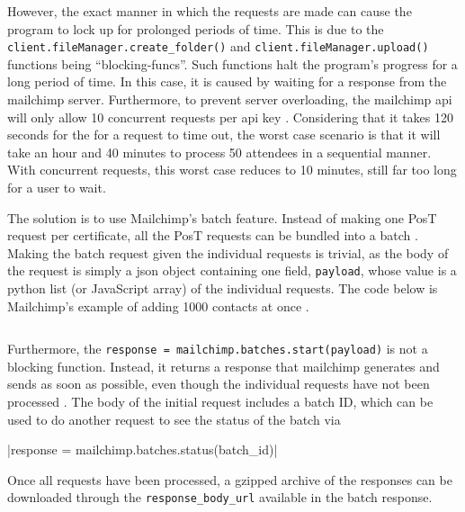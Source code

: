 \documentclass[11pt]{article}
\begin{document}
However, the exact manner in which the \gls{request}s are made can cause the program to lock up for prolonged periods of time. This is due to the \texttt{client.fileManager.create_folder()} and \texttt{client.fileManager.upload()} functions being ``\glspl{blocking-func}''. Such functions halt the program's progress for a long period of time. In this case, it is caused by waiting for a \gls{response} from the \Gls{mailchimp} \gls{server}. Furthermore, to prevent \gls{server} overloading, the \Gls{mailchimp} \acrshort{api} will only allow 10 concurrent \gls{request}s per \acrshort{api} key \cite{mailchimp-batch}. Considering that it takes 120 seconds for the for a \gls{request} to time out, the worst case scenario is that it will take an hour and 40 minutes to process 50 attendees in a sequential manner. With concurrent \gls{request}s, this worst case reduces to 10 minutes, still far too long for a \gls{user} to wait.

The solution is to use Mailchimp's \gls{batch} feature. Instead of making one P\acrshort{os}T \gls{request} per certificate, all the P\acrshort{os}T \gls{request}s can be bundled into a \gls{batch} \cite{mailchimp-batch}. Making the \gls{batch} \gls{request} given the individual \gls{request}s is trivial, as the body of the \gls{request} is simply a \acrshort{json} \gls{object} containing one field, \texttt{payload}, whose value is a \Gls{python} list (or JavaScript \gls{array}) of the individual \gls{request}s. The code below is Mailchimp's example of adding 1000 contacts at once \cite{mailchimp-batch}.

\inputminted[linenos=true]{python}{mailchimp_examples/batch_request.py}

Furthermore, the \texttt{response = mailchimp.batches.start(payload)} is not a blocking function. Instead, it returns a \gls{response} that \Gls{mailchimp} generates and sends as soon as possible, even though the individual \gls{request}s have not been processed \cite{mailchimp-batch}. The body of the initial \gls{request} includes a \gls{batch} ID, which can be used to do another \gls{request} to see the status of the \gls{batch} via

|response = mailchimp.batches.status(batch_id)|

\noindent
Once all \gls{request}s have been processed, a gzipped archive of the \gls{response}s can be downloaded through the \texttt{response\_body\_url} available in the \gls{batch} \gls{response}.
\end{document}
